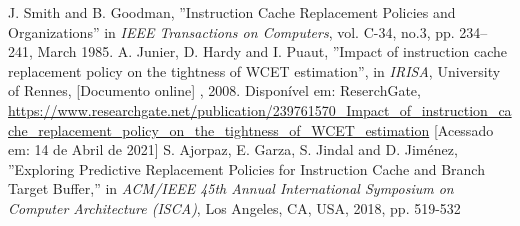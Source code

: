 \documentclass[conference]{IEEEtran}
\begin{document}
\begin{thebibliography}{00}
 J. Smith and B. Goodman, ''Instruction Cache Replacement Policies and Organizations'' in \emph{IEEE Transactions on Computers}, vol. C-34, no.3, pp. 234--241, March 1985.
 A. Junier, D. Hardy and I. Puaut, ''Impact of instruction cache replacement policy on the tightness of WCET estimation'', in \emph{IRISA}, University of Rennes, [Documento online] , 2008. Disponível em: ReserchGate, \url{https://www.researchgate.net/publication/239761570_Impact_of_instruction_cache_replacement_policy_on_the_tightness_of_WCET_estimation} [Acessado em: 14 de Abril de 2021] 
 S. Ajorpaz, E. Garza, S. Jindal and D. Jiménez, ''Exploring Predictive Replacement Policies for Instruction Cache and Branch Target Buffer,'' in \emph{ACM/IEEE 45th Annual International Symposium on Computer Architecture (ISCA)}, Los Angeles, CA, USA, 2018, pp. 519-532
\end{thebibliography}
\end{document}
